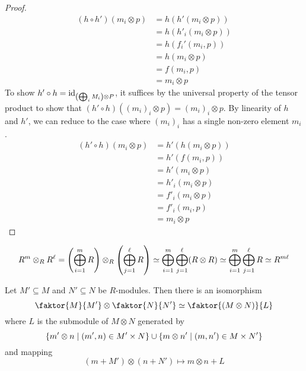 \begin{proof}
    \begin{align*}
        (h \circ h')(m_i \otimes p) &= h(h'(m_i \otimes p)) \\
        &= h(h'_i(m_i \otimes p)) \\
        &= h(f_i'(m_i, p)) \\
        &= h(m_i \otimes p) \\
        &= f(m_i, p) \\
        &= m_i \otimes p
    \end{align*}
    To show \( h' \circ h = \operatorname{id}_{\qty(\bigoplus_i M_i) \otimes P} \), it suffices by the universal property of the tensor product to show that \( (h' \circ h)((m_i)_i \otimes p) = (m_i)_i \otimes p \).
    By linearity of \( h \) and \( h' \), we can reduce to the case where \( (m_i)_i \) has a single non-zero element \( m_i \).
    \begin{align*}
        (h' \circ h)(m_i \otimes p) &= h'(h(m_i \otimes p)) \\
        &= h'(f(m_i, p)) \\
        &= h'(m_i \otimes p) \\
        &= h'_i(m_i \otimes p) \\
        &= f'_i(m_i \otimes p) \\
        &= f'_i(m_i, p) \\
        &= m_i \otimes p
    \end{align*}
\end{proof}
\begin{example}
    \[ R^m \otimes_R R^\ell = \qty(\bigoplus_{i=1}^m R) \otimes_R \qty(\bigoplus_{j=1}^\ell R) \simeq \bigoplus_{i=1}^m \bigoplus_{j=1}^\ell (R \otimes R) \simeq \bigoplus_{i=1}^m \bigoplus_{j=1}^\ell R \simeq R^{m\ell} \]
\end{example}
\begin{proposition}[quotients]
    Let \( M' \subseteq M \) and \( N' \subseteq N \) be \( R \)-modules.
    Then there is an isomorphism
    \[ \faktor{M}{M'} \otimes \faktor{N}{N'} \simeq \faktor{(M \otimes N)}{L} \]
    where \( L \) is the submodule of \( M \otimes N \) generated by
    \[ \qty{m' \otimes n \mid (m', n) \in M' \times N} \cup \qty{m \otimes n' \mid (m, n') \in M \times N'} \]
    and mapping
    \[ (m + M') \otimes (n + N') \mapsto m \otimes n + L \]
\end{proposition}
